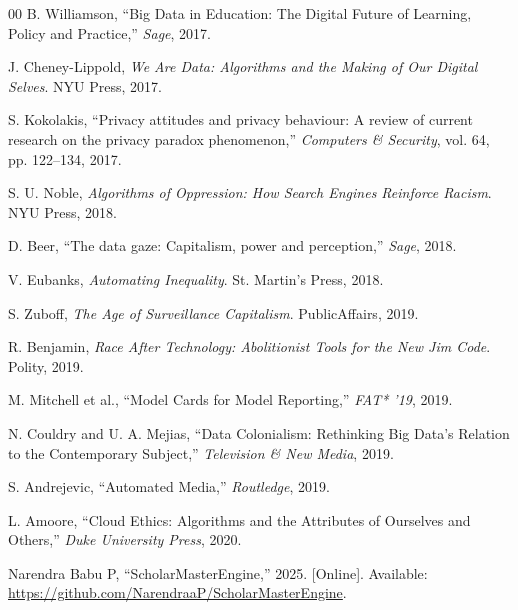 \documentclass[conference]{IEEEtran}
\begin{document}
\begin{thebibliography}{00}
 B. Williamson, ``Big Data in Education: The Digital Future of Learning, Policy and Practice,'' \textit{Sage}, 2017.

 J. Cheney-Lippold, \textit{We Are Data: Algorithms and the Making of Our Digital Selves}. NYU Press, 2017.

 S. Kokolakis, ``Privacy attitudes and privacy behaviour: A review of current research on the privacy paradox phenomenon,'' \textit{Computers \& Security}, vol. 64, pp. 122--134, 2017.

 S. U. Noble, \textit{Algorithms of Oppression: How Search Engines Reinforce Racism}. NYU Press, 2018.

 D. Beer, ``The data gaze: Capitalism, power and perception,'' \textit{Sage}, 2018.

 V. Eubanks, \textit{Automating Inequality}. St. Martin's Press, 2018.

 S. Zuboff, \textit{The Age of Surveillance Capitalism}. PublicAffairs, 2019.

 R. Benjamin, \textit{Race After Technology: Abolitionist Tools for the New Jim Code}. Polity, 2019.

 M. Mitchell et al., ``Model Cards for Model Reporting,'' \textit{FAT* '19}, 2019.

 N. Couldry and U. A. Mejias, ``Data Colonialism: Rethinking Big Data's Relation to the Contemporary Subject,'' \textit{Television \& New Media}, 2019.

 S. Andrejevic, ``Automated Media,'' \textit{Routledge}, 2019.

 L. Amoore, ``Cloud Ethics: Algorithms and the Attributes of Ourselves and Others,'' \textit{Duke University Press}, 2020.

 Narendra Babu P, ``ScholarMasterEngine,'' 2025. [Online]. Available: \url{https://github.com/NarendraaP/ScholarMasterEngine}.

\end{thebibliography}
\end{document}
